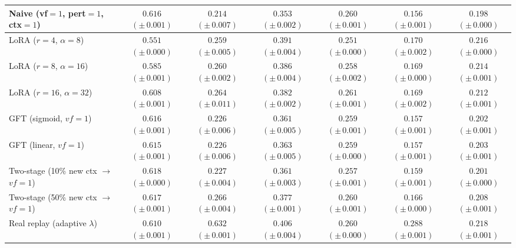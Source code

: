 \begin{table}[t]
{\begin{tabular}{@{}lcccccc@{}}
Naive (vf${=}1$, pert${=}1$, ctx${=}1$) & $0.616$ {\scriptsize $(\pm\,0.001)$} & $0.214$ {\scriptsize $(\pm\,0.007)$} & $0.353$ {\scriptsize $(\pm\,0.002)$} & $0.260$ {\scriptsize $(\pm\,0.001)$} & $0.156$ {\scriptsize $(\pm\,0.001)$} & $0.198$ {\scriptsize $(\pm\,0.000)$} \\
\midrule
LoRA ($r{=}4$, $\alpha{=}8$) & $0.551$ {\scriptsize $(\pm\,0.000)$} & $0.259$ {\scriptsize $(\pm\,0.005)$} & $0.391$ {\scriptsize $(\pm\,0.004)$} & $0.251$ {\scriptsize $(\pm\,0.000)$} & $0.170$ {\scriptsize $(\pm\,0.002)$} & $0.216$ {\scriptsize $(\pm\,0.000)$} \\
LoRA ($r{=}8$, $\alpha{=}16$) & $0.585$ {\scriptsize $(\pm\,0.001)$} & $0.260$ {\scriptsize $(\pm\,0.002)$} & $0.386$ {\scriptsize $(\pm\,0.004)$} & $0.258$ {\scriptsize $(\pm\,0.002)$} & $0.169$ {\scriptsize $(\pm\,0.000)$} & $0.214$ {\scriptsize $(\pm\,0.001)$} \\
LoRA ($r{=}16$, $\alpha{=}32$) & $0.608$ {\scriptsize $(\pm\,0.001)$} & $0.264$ {\scriptsize $(\pm\,0.011)$} & $0.382$ {\scriptsize $(\pm\,0.002)$} & $0.261$ {\scriptsize $(\pm\,0.001)$} & $0.169$ {\scriptsize $(\pm\,0.002)$} & $0.212$ {\scriptsize $(\pm\,0.001)$} \\
GFT (sigmoid, $vf{=}1$) & $0.616$ {\scriptsize $(\pm\,0.001)$} & $0.226$ {\scriptsize $(\pm\,0.006)$} & $0.361$ {\scriptsize $(\pm\,0.005)$} & $0.259$ {\scriptsize $(\pm\,0.001)$} & $0.157$ {\scriptsize $(\pm\,0.001)$} & $0.202$ {\scriptsize $(\pm\,0.001)$} \\
GFT (linear, $vf{=}1$) & $0.615$ {\scriptsize $(\pm\,0.001)$} & $0.226$ {\scriptsize $(\pm\,0.006)$} & $0.363$ {\scriptsize $(\pm\,0.005)$} & $0.259$ {\scriptsize $(\pm\,0.000)$} & $0.157$ {\scriptsize $(\pm\,0.001)$} & $0.203$ {\scriptsize $(\pm\,0.001)$} \\
Two-stage (10\% new ctx $\to$ $vf{=}1$) & $0.618$ {\scriptsize $(\pm\,0.000)$} & $0.227$ {\scriptsize $(\pm\,0.004)$} & $0.361$ {\scriptsize $(\pm\,0.003)$} & $0.257$ {\scriptsize $(\pm\,0.001)$} & $0.159$ {\scriptsize $(\pm\,0.001)$} & $0.201$ {\scriptsize $(\pm\,0.000)$} \\
Two-stage (50\% new ctx $\to$ $vf{=}1$) & $0.617$ {\scriptsize $(\pm\,0.001)$} & $0.266$ {\scriptsize $(\pm\,0.004)$} & $0.377$ {\scriptsize $(\pm\,0.001)$} & $0.260$ {\scriptsize $(\pm\,0.001)$} & $0.166$ {\scriptsize $(\pm\,0.000)$} & $0.208$ {\scriptsize $(\pm\,0.001)$} \\
\midrule
\rowcolor{referencerow} Real replay (adaptive $\lambda$) & $0.610$ {\scriptsize $(\pm\,0.001)$} & $0.632$ {\scriptsize $(\pm\,0.001)$} & $0.406$ {\scriptsize $(\pm\,0.004)$} & $0.260$ {\scriptsize $(\pm\,0.000)$} & $0.288$ {\scriptsize $(\pm\,0.001)$} & $0.218$ {\scriptsize $(\pm\,0.001)$} \\

\end{tabular}}
\end{table}

